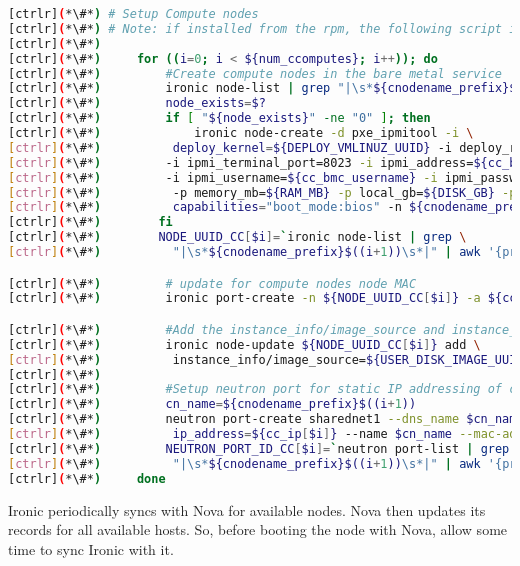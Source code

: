 
\begin{lstlisting}[language=bash,keywords={}]
[ctrlr](*\#*) # Setup Compute nodes
[ctrlr](*\#*) # Note: if installed from the rpm, the following script is installed as setup_compute_nodes.sh 
[ctrlr](*\#*) 
[ctrlr](*\#*)     for ((i=0; i < ${num_ccomputes}; i++)); do
[ctrlr](*\#*)         #Create compute nodes in the bare metal service
[ctrlr](*\#*)         ironic node-list | grep "|\s*${cnodename_prefix}$((i+1))\s*|"
[ctrlr](*\#*)         node_exists=$?
[ctrlr](*\#*)         if [ "${node_exists}" -ne "0" ]; then
[ctrlr](*\#*)             ironic node-create -d pxe_ipmitool -i \
[ctrlr](*\#*)          deploy_kernel=${DEPLOY_VMLINUZ_UUID} -i deploy_ramdisk=${DEPLOY_INITRD_UUID} \
[ctrlr](*\#*)         -i ipmi_terminal_port=8023 -i ipmi_address=${cc_bmc[$i]} \
[ctrlr](*\#*)         -i ipmi_username=${cc_bmc_username} -i ipmi_password=${cc_bmc_password} -p cpus=${CPU} \
[ctrlr](*\#*)          -p memory_mb=${RAM_MB} -p local_gb=${DISK_GB} -p cpu_arch=${ARCH} -p \
[ctrlr](*\#*)          capabilities="boot_mode:bios" -n ${cnodename_prefix}$((i+1))
[ctrlr](*\#*)        fi
[ctrlr](*\#*)        NODE_UUID_CC[$i]=`ironic node-list | grep \
[ctrlr](*\#*)          "|\s*${cnodename_prefix}$((i+1))\s*|" | awk '{print $2}'`

[ctrlr](*\#*)         # update for compute nodes node MAC
[ctrlr](*\#*)         ironic port-create -n ${NODE_UUID_CC[$i]} -a ${cc_mac[$i]}

[ctrlr](*\#*)         #Add the instance_info/image_source and instance_info/root_gb
[ctrlr](*\#*)         ironic node-update ${NODE_UUID_CC[$i]} add \
[ctrlr](*\#*)          instance_info/image_source=${USER_DISK_IMAGE_UUID} instance_info/root_gb=50
[ctrlr](*\#*) 
[ctrlr](*\#*)         #Setup neutron port for static IP addressing of compute nodes
[ctrlr](*\#*)         cn_name=${cnodename_prefix}$((i+1))
[ctrlr](*\#*)         neutron port-create sharednet1 --dns_name $cn_name --fixed-ip \
[ctrlr](*\#*)          ip_address=${cc_ip[$i]} --name $cn_name --mac-address ${cc_mac[$i]}
[ctrlr](*\#*)         NEUTRON_PORT_ID_CC[$i]=`neutron port-list | grep \
[ctrlr](*\#*)          "|\s*${cnodename_prefix}$((i+1))\s*|" | awk '{print $2}'`
[ctrlr](*\#*)     done
\end{lstlisting} 
\newpage

	Ironic periodically syncs with Nova for available nodes. Nova then updates its records for all available hosts. So, before booting the node with Nova, allow some time to sync Ironic with it. 

